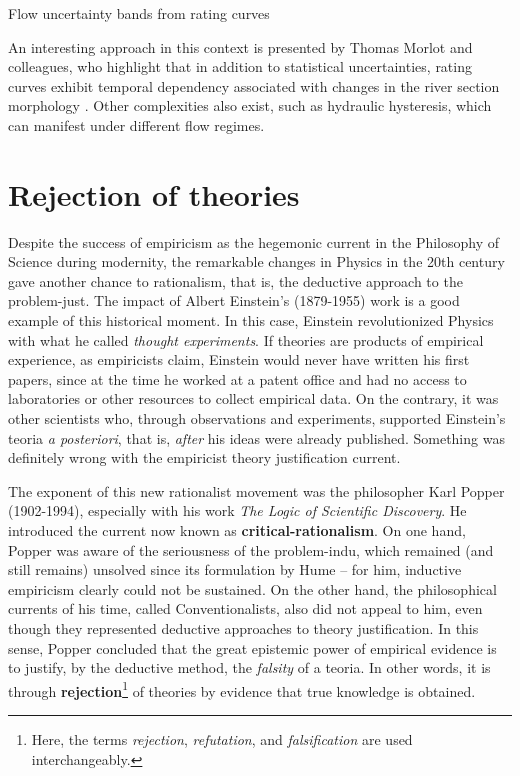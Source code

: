 \documentclass[./main_en.tex]{subfiles}
\begin{document}
\begin{simplebox}[
    float=htb,
    label={destaque_curvas_chave},
    nameref={Rating Curves}
    ]{Flow uncertainty bands from rating curves}
\begin{minipage}[t]{\linewidth}
    \par An interesting approach in this context is presented by Thomas Morlot and colleagues, who highlight that in addition to statistical uncertainties, rating curves exhibit temporal dependency associated with changes in the river section morphology \cite{Morlot2014}. Other complexities also exist, such as hydraulic hysteresis, which can manifest under different flow regimes.
    \end{minipage}
\label{box:rating-curve}
\normalsize
\end{simplebox}


\section{Rejection of theories} \label{sec:epis:popper}

\par Despite the success of \gls{empiricism} as the hegemonic current in the Philosophy of Science during modernity, the remarkable changes in Physics in the 20th century gave another chance to \gls{rationalism}, that is, the deductive approach to the \gls{problem-just}. The impact of Albert Einstein's (1879-1955) work is a good example of this historical moment. In this case, Einstein revolutionized Physics with what he called \textit{thought experiments}. If theories are products of empirical experience, as empiricists claim, Einstein would never have written his first papers, since at the time he worked at a patent office and had no access to laboratories or other resources to collect empirical data. On the contrary, it was other scientists who, through observations and experiments, supported Einstein's \gls{teoria} \textit{a posteriori}, that is, \textit{after} his ideas were already published. Something was definitely wrong with the empiricist theory justification current.

\par The exponent of this new rationalist movement was the philosopher Karl Popper (1902-1994), especially with his work \textit{The Logic of Scientific Discovery}. He introduced the current now known as \textbf{\gls{critical-rationalism}}. On one hand, Popper was aware of the seriousness of the \gls{problem-indu}, which remained (and still remains) unsolved since its formulation by Hume – for him, inductive \gls{empiricism} clearly could not be sustained. On the other hand, the philosophical currents of his time, called Conventionalists, also did not appeal to him, even though they represented deductive approaches to theory justification. In this sense, Popper concluded that the great epistemic power of empirical evidence is to justify, by the deductive method, the \textit{falsity} of a \gls{teoria}. In other words, it is through \textbf{rejection}\footnote{Here, the terms \textit{rejection}, \textit{refutation}, and \textit{falsification} are used interchangeably.} of theories by evidence that true knowledge is obtained.
\end{document}
